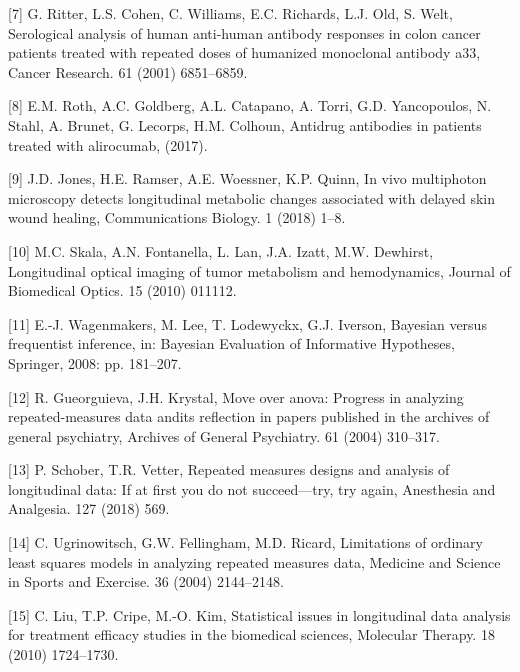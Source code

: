 \documentclass[
]{article}
\begin{document}
\leavevmode\hypertarget{ref-ritter2001}{}%
{[}7{]} G. Ritter, L.S. Cohen, C. Williams, E.C. Richards, L.J. Old, S. Welt, Serological analysis of human anti-human antibody responses in colon cancer patients treated with repeated doses of humanized monoclonal antibody a33, Cancer Research. 61 (2001) 6851--6859.

\leavevmode\hypertarget{ref-roth2017}{}%
{[}8{]} E.M. Roth, A.C. Goldberg, A.L. Catapano, A. Torri, G.D. Yancopoulos, N. Stahl, A. Brunet, G. Lecorps, H.M. Colhoun, Antidrug antibodies in patients treated with alirocumab, (2017).

\leavevmode\hypertarget{ref-jones2018}{}%
{[}9{]} J.D. Jones, H.E. Ramser, A.E. Woessner, K.P. Quinn, In vivo multiphoton microscopy detects longitudinal metabolic changes associated with delayed skin wound healing, Communications Biology. 1 (2018) 1--8.

\leavevmode\hypertarget{ref-skala2010}{}%
{[}10{]} M.C. Skala, A.N. Fontanella, L. Lan, J.A. Izatt, M.W. Dewhirst, Longitudinal optical imaging of tumor metabolism and hemodynamics, Journal of Biomedical Optics. 15 (2010) 011112.

\leavevmode\hypertarget{ref-wagenmakers2008}{}%
{[}11{]} E.-J. Wagenmakers, M. Lee, T. Lodewyckx, G.J. Iverson, Bayesian versus frequentist inference, in: Bayesian Evaluation of Informative Hypotheses, Springer, 2008: pp. 181--207.

\leavevmode\hypertarget{ref-gueorguieva2004}{}%
{[}12{]} R. Gueorguieva, J.H. Krystal, Move over anova: Progress in analyzing repeated-measures data andits reflection in papers published in the archives of general psychiatry, Archives of General Psychiatry. 61 (2004) 310--317.

\leavevmode\hypertarget{ref-schober2018}{}%
{[}13{]} P. Schober, T.R. Vetter, Repeated measures designs and analysis of longitudinal data: If at first you do not succeed---try, try again, Anesthesia and Analgesia. 127 (2018) 569.

\leavevmode\hypertarget{ref-ugrinowitsch2004}{}%
{[}14{]} C. Ugrinowitsch, G.W. Fellingham, M.D. Ricard, Limitations of ordinary least squares models in analyzing repeated measures data, Medicine and Science in Sports and Exercise. 36 (2004) 2144--2148.

\leavevmode\hypertarget{ref-liu2010}{}%
{[}15{]} C. Liu, T.P. Cripe, M.-O. Kim, Statistical issues in longitudinal data analysis for treatment efficacy studies in the biomedical sciences, Molecular Therapy. 18 (2010) 1724--1730.
\end{document}

